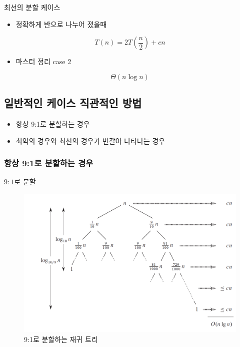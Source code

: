 \documentclass[10pt]{beamer}
\begin{document}
\begin{frame}{최선의 분할 케이스}
    \pause
    \begin{itemize}
        \item 정확하게 반으로 나누어 졌을때
    \end{itemize}
    \pause
    $$T(n) = 2T\left( \dfrac{n}{2}  \right) + cn $$
    \begin{itemize}
        \item 마스터 정리 case 2
    \end{itemize}
    $$\Theta(n\log n)$$
    
\end{frame}

\subsection{일반적인 케이스 직관적인 방법} 
\begin{frame}
    \begin{itemize}
        \item 항상 9:1로 분할하는 경우
        \item 최악의 경우와 최선의 경우가 번갈아 나타나는 경우
    \end{itemize}
\end{frame}

\subsubsection{항상 9:1로 분할하는 경우}

\begin{frame}{$9:1$로 분할}
    \begin{figure}[h!]
        \raggedleft
        \includegraphics[scale=0.3]{./QuickSort/pic/q9.png}
        \caption{9:1로 분할하는 재귀 트리\cite{reference1}}
    \end{figure}
\end{frame}
\end{document}
